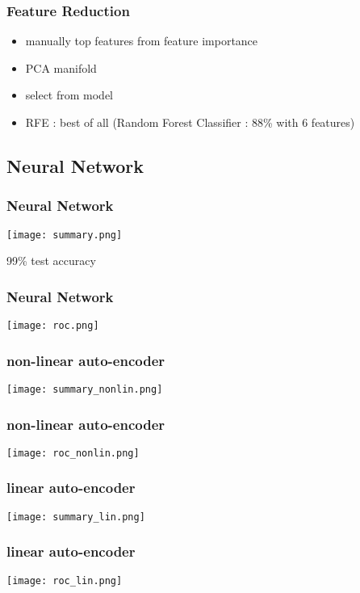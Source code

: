 \documentclass[11pt]{beamer}
\begin{document}
\begin{frame}
\frametitle{Feature Reduction}

\begin{itemize}
 \item manually top features from feature importance
 \item PCA
 \itme manifold
 \item select from model
 \item RFE : best of all (Random Forest Classifier : 88\% with 6 features)
\end{itemize}

\end{frame}

\subsection{Neural Network}
\begin{frame}
\frametitle{Neural Network}
 \item \texttt{[image: summary.png]}
 \item 99\% test accuracy
\end{frame}


\begin{frame}
\frametitle{Neural Network}
\texttt{[image: roc.png]}

\end{frame}


\begin{frame}
\frametitle{non-linear auto-encoder}
\texttt{[image: summary\_nonlin.png]}
\end{frame}


\begin{frame}
\frametitle{non-linear auto-encoder}
\texttt{[image: roc\_nonlin.png]}
\end{frame}


\begin{frame}
\frametitle{linear auto-encoder}
\texttt{[image: summary\_lin.png]}
\end{frame}


\begin{frame}
\frametitle{linear auto-encoder}
\texttt{[image: roc\_lin.png]}
\end{frame}
\end{document}
